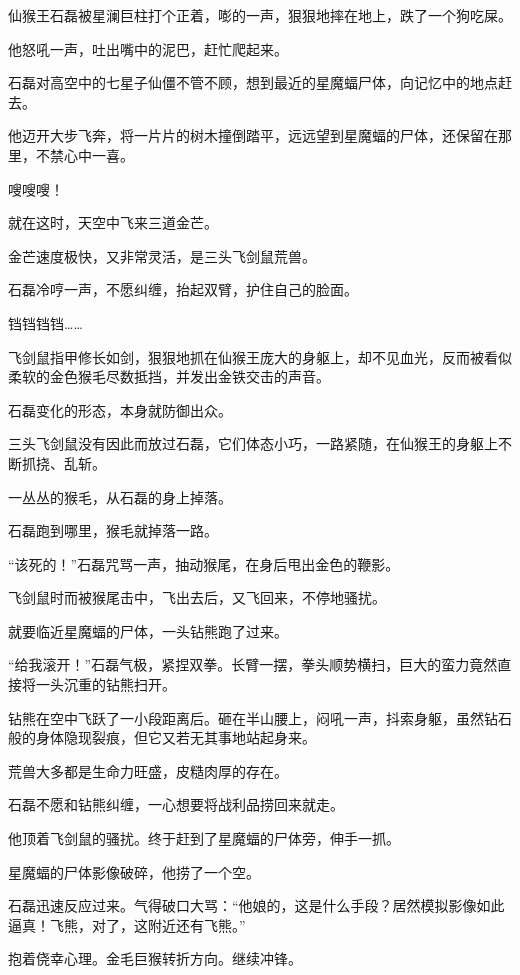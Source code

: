 
\begin{this_body}

仙猴王石磊被星澜巨柱打个正着，嘭的一声，狠狠地摔在地上，跌了一个狗吃屎。

他怒吼一声，吐出嘴中的泥巴，赶忙爬起来。

石磊对高空中的七星子仙僵不管不顾，想到最近的星魔蝠尸体，向记忆中的地点赶去。

他迈开大步飞奔，将一片片的树木撞倒踏平，远远望到星魔蝠的尸体，还保留在那里，不禁心中一喜。

嗖嗖嗖！

就在这时，天空中飞来三道金芒。

金芒速度极快，又非常灵活，是三头飞剑鼠荒兽。

石磊冷哼一声，不愿纠缠，抬起双臂，护住自己的脸面。

铛铛铛铛……

飞剑鼠指甲修长如剑，狠狠地抓在仙猴王庞大的身躯上，却不见血光，反而被看似柔软的金色猴毛尽数抵挡，并发出金铁交击的声音。

石磊变化的形态，本身就防御出众。

三头飞剑鼠没有因此而放过石磊，它们体态小巧，一路紧随，在仙猴王的身躯上不断抓挠、乱斩。

一丛丛的猴毛，从石磊的身上掉落。

石磊跑到哪里，猴毛就掉落一路。

“该死的！”石磊咒骂一声，抽动猴尾，在身后甩出金色的鞭影。

飞剑鼠时而被猴尾击中，飞出去后，又飞回来，不停地骚扰。

就要临近星魔蝠的尸体，一头钻熊跑了过来。

“给我滚开！”石磊气极，紧捏双拳。长臂一摆，拳头顺势横扫，巨大的蛮力竟然直接将一头沉重的钻熊扫开。

钻熊在空中飞跃了一小段距离后。砸在半山腰上，闷吼一声，抖索身躯，虽然钻石般的身体隐现裂痕，但它又若无其事地站起身来。

荒兽大多都是生命力旺盛，皮糙肉厚的存在。

石磊不愿和钻熊纠缠，一心想要将战利品捞回来就走。

他顶着飞剑鼠的骚扰。终于赶到了星魔蝠的尸体旁，伸手一抓。

星魔蝠的尸体影像破碎，他捞了一个空。

石磊迅速反应过来。气得破口大骂：“他娘的，这是什么手段？居然模拟影像如此逼真！飞熊，对了，这附近还有飞熊。”

抱着侥幸心理。金毛巨猴转折方向。继续冲锋。


\end{this_body}
